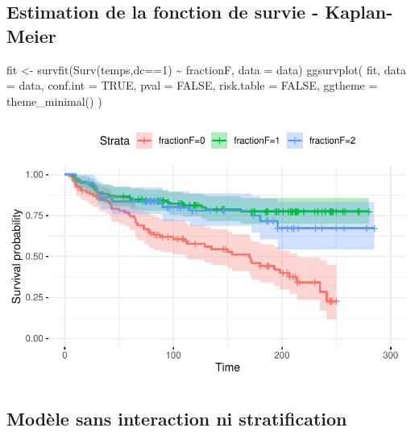 \documentclass[
  letterpaper,
  DIV=11,
  numbers=noendperiod]{scrartcl}
\newenvironment{Shaded}{\begin{snugshade}}{\end{snugshade}}
\newcommand{\AttributeTok}[1]{\textcolor[rgb]{0.40,0.45,0.13}{#1}}
\newcommand{\ConstantTok}[1]{\textcolor[rgb]{0.56,0.35,0.01}{#1}}
\newcommand{\DecValTok}[1]{\textcolor[rgb]{0.68,0.00,0.00}{#1}}
\newcommand{\FunctionTok}[1]{\textcolor[rgb]{0.28,0.35,0.67}{#1}}
\newcommand{\NormalTok}[1]{\textcolor[rgb]{0.00,0.23,0.31}{#1}}
\newcommand{\OtherTok}[1]{\textcolor[rgb]{0.00,0.23,0.31}{#1}}
\newcommand{\SpecialCharTok}[1]{\textcolor[rgb]{0.37,0.37,0.37}{#1}}
\begin{document}
\subsection{Estimation de la fonction de survie -
Kaplan-Meier}\label{estimation-de-la-fonction-de-survie---kaplan-meier}

\begin{Shaded}
\begin{Highlighting}[]
\NormalTok{fit }\OtherTok{\textless{}{-}} \FunctionTok{survfit}\NormalTok{(}\FunctionTok{Surv}\NormalTok{(temps,dc}\SpecialCharTok{==}\DecValTok{1}\NormalTok{) }\SpecialCharTok{\textasciitilde{}}\NormalTok{ fractionF, }\AttributeTok{data =}\NormalTok{ data)}
\FunctionTok{ggsurvplot}\NormalTok{(}
\NormalTok{  fit, }
  \AttributeTok{data =}\NormalTok{ data,}
  \AttributeTok{conf.int =} \ConstantTok{TRUE}\NormalTok{,}
  \AttributeTok{pval =} \ConstantTok{FALSE}\NormalTok{,}
  \AttributeTok{risk.table =} \ConstantTok{FALSE}\NormalTok{,}
  \AttributeTok{ggtheme =} \FunctionTok{theme\_minimal}\NormalTok{()}
\NormalTok{)}
\end{Highlighting}
\end{Shaded}

\includegraphics{Rapport-technique_files/figure-pdf/unnamed-chunk-2-1.pdf}

\subsection{Modèle sans interaction ni
stratification}\label{moduxe8le-sans-interaction-ni-stratification}
\end{document}
